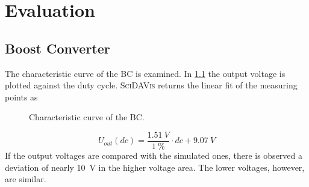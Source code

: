 \chapter{Evaluation}
%
\section{Boost Converter}
    The characteristic curve of the BC is examined. In \cref{fig:characteristic-curve-of-the-boost-converter}
    the output voltage is plotted against the duty cycle. \textsc{SciDAVis} returns the linear fit of the measuring points as
    \begin{figure}[h]
        \centering
        
        \caption[Characteristic curve of the BC]{Characteristic curve of the BC.}
        \label{fig:characteristic-curve-of-the-boost-converter}
    \end{figure}
    \begin{equation}
        U_{out}(dc)=\frac{\SI{1.51}{V}}{\SI{1}{\percent}} \cdot dc + \SI{9.07}{V}
    \end{equation}
    If the output voltages are compared with the simulated ones, there is observed a deviation of nearly \SI{10}{V} in the
    higher voltage area. The lower voltages, however, are similar.
